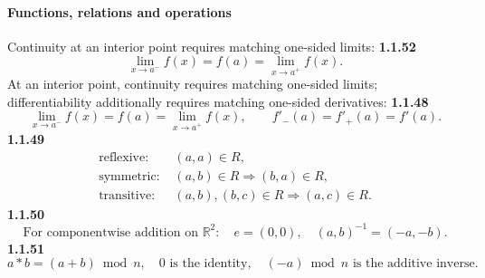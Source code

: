 \paragraph*{Functions, relations and operations}
Continuity at an interior point requires matching one-sided limits:
\noindent\textbf{1.1.52}\quad
\begin{equation}
\lim_{x\to a^-}f(x)=f(a)=\lim_{x\to a^+}f(x).\tag{1.1.52.1}\label{eq:continuity-limits-52}
\end{equation}
At an interior point, continuity requires matching one-sided limits; differentiability additionally requires matching one-sided derivatives:
\noindent\textbf{1.1.48}\quad
\[\lim_{x\to a^-}f(x)=f(a)=\lim_{x\to a^+}f(x),\qquad f'_{-}(a)=f'_{+}(a)=f'(a).\tag{1.1.48.1}\]
\noindent\textbf{1.1.49}\quad
\[
\begin{aligned}
\text{reflexive: }&(a,a)\in R,\\
\text{symmetric: }&(a,b)\in R\Rightarrow(b,a)\in R,\\
\text{transitive: }&(a,b),(b,c)\in R\Rightarrow(a,c)\in R.
\end{aligned}\tag{1.1.49.1}
\]
\noindent\textbf{1.1.50}\quad
\[\text{For componentwise addition on }\mathbb R^2:\quad e=(0,0),\quad (a,b)^{-1}=(-a,-b).\tag{1.1.50.1}\]
\noindent\textbf{1.1.51}\quad
\[a*b=(a+b)\bmod n,\quad 0\text{ is the identity},\quad (-a)\bmod n\text{ is the additive inverse}.\tag{1.1.51.1}\]

